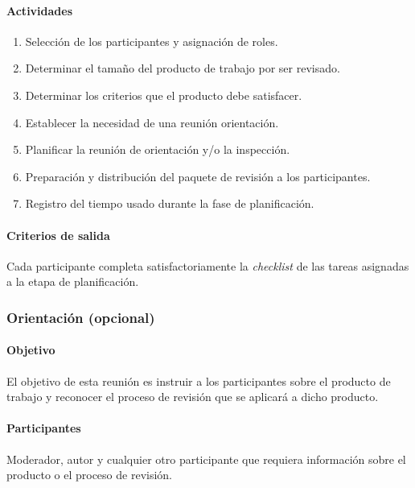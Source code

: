 \paragraph{Actividades}
\begin{enumerate}
	\item 
		Selección de los participantes y asignación de roles.
	\item
		Determinar el tamaño del producto de trabajo por ser revisado.
	\item
		Determinar los criterios que el producto debe satisfacer.
	\item
		Establecer la necesidad de una reunión orientación.
	\item
		Planificar la reunión de orientación y/o la inspección.
	\item
		Preparación y distribución del paquete de revisión a los participantes.
	\item
		Registro del tiempo usado durante la fase de planificación.
\end{enumerate}

\paragraph{Criterios de salida\\}

Cada participante completa satisfactoriamente la \textit{checklist} de las tareas asignadas a la etapa de planificación. 

\subsubsection{Orientación (opcional)}

\paragraph{Objetivo\\}

El objetivo de esta reunión es instruir a los participantes sobre el producto de trabajo y reconocer el proceso de revisión que se aplicará a dicho producto.

\paragraph{Participantes\\}

Moderador, autor y cualquier otro participante que requiera información sobre el producto o el proceso de revisión.

